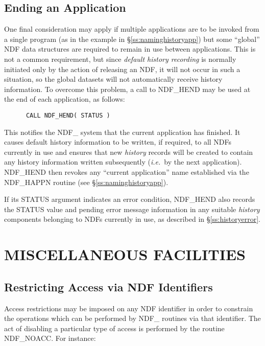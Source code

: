 \documentclass[twoside,11pt]{article}
\newcommand{\htmlref}[2]{#1}
\newcommand{\xlabel}[1]{}
\newcommand{\st}[1]{{\em{#1}}}
\begin{document}
\subsection{\xlabel{ending_an_application}\label{ss:endhistory}Ending an Application}

One final consideration may apply if multiple applications are to be
invoked from a single program (as in the example in
\S\ref{ss:naminghistoryapp}) but some ``global'' NDF data structures
are required to remain in use between applications. This is not a common
requirement, but since \st{default history recording\/} is normally initiated
only by the action of releasing an NDF, it will not occur in such a
situation, so the global datasets will not automatically receive
history information. To overcome this problem, a call to \htmlref{NDF\_HEND}{NDF_HEND} may
be used at the end of each application, as follows:

\small
\begin{verbatim}
      CALL NDF_HEND( STATUS )
\end{verbatim}
\normalsize

This notifies the NDF\_ system that the current application has
finished. It causes default history information to be written, if
required, to all NDFs currently in use and ensures that new
\st{history\/} records will be created to contain any history
information 
written subsequently (\st{i.e.}\ by the next application). NDF\_HEND
then revokes any ``current application'' name established via the
\htmlref{NDF\_HAPPN}{NDF_HAPPN} routine (see \S\ref{ss:naminghistoryapp}).

If its STATUS argument indicates an error condition, NDF\_HEND also
records the STATUS value and pending error message information in any
suitable \st{history\/} components belonging to NDFs currently in
use, as described in \S\ref{ss:historyerror}.


\section{\xlabel{miscellaneous_facilities}MISCELLANEOUS FACILITIES}

\subsection{\xlabel{restricting_access_via_ndf_identifiers}\label{ss:restrictingaccess}Restricting Access via NDF Identifiers}

Access restrictions may be imposed on any NDF identifier in order to
constrain the operations which can be performed by NDF\_ routines via that
identifier. 
The act of disabling a particular type of access is performed by the routine
\htmlref{NDF\_NOACC}{NDF_NOACC}. 
For instance:
\end{document}
